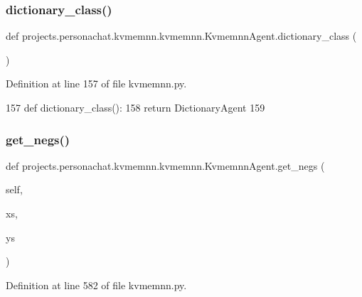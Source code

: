 \subsubsection{\texorpdfstring{dictionary\+\_\+class()}{dictionary\_class()}}
{\footnotesize\ttfamily def projects.\+personachat.\+kvmemnn.\+kvmemnn.\+Kvmemnn\+Agent.\+dictionary\+\_\+class (\begin{DoxyParamCaption}{ }\end{DoxyParamCaption})\hspace{0.3cm}{\ttfamily [static]}}



Definition at line 157 of file kvmemnn.\+py.


\begin{DoxyCode}
157     \textcolor{keyword}{def }dictionary\_class():
158         \textcolor{keywordflow}{return} DictionaryAgent
159 
\end{DoxyCode}
\mbox{\label{classprojects_1_1personachat_1_1kvmemnn_1_1kvmemnn_1_1KvmemnnAgent_a09465d37d783449e34b969287abb1a0c}} 
\subsubsection{\texorpdfstring{get\+\_\+negs()}{get\_negs()}}
{\footnotesize\ttfamily def projects.\+personachat.\+kvmemnn.\+kvmemnn.\+Kvmemnn\+Agent.\+get\+\_\+negs (\begin{DoxyParamCaption}\item[{}]{self,  }\item[{}]{xs,  }\item[{}]{ys }\end{DoxyParamCaption})}



Definition at line 582 of file kvmemnn.\+py.


